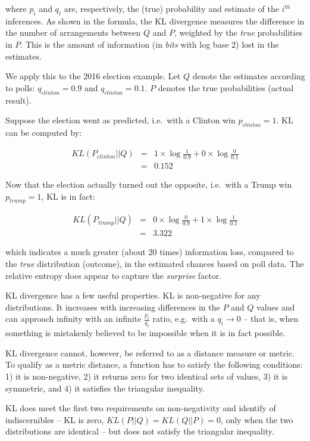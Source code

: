 \documentclass[
  letterpaper,
]{scrbook}
\begin{document}
where \(p_i\) and \(q_i\) are, respectively, the (true) probability and
estimate of the \(i^{th}\) inferences. As shown in the formula, the KL
divergence measures the difference in the number of arrangements between
\(Q\) and \(P\), weighted by the \emph{true} probabilities in \(P\).
This is the amount of information (in \emph{bits} with log base \(2\))
lost in the estimates.

We apply this to the 2016 election example. Let \(Q\) denote the
estimates according to polls: \(q_{clinton}=0.9\) and
\(q_{clinton}=0.1\). \(P\) denotes the true probabilities (actual
result).

Suppose the election went as predicted, i.e.~with a Clinton win
\(p_{clinton}=1\). KL can be computed by:

\[\begin{aligned}
  KL(P_{clinton}||Q)
  & = & 1 \times \log \frac{1}{0.9} + 0 \times \log \frac{0}{0.1} \\
  & = & 0.152
\end{aligned}\]

Now that the election actually turned out the opposite, i.e.~with a
Trump win \(p_{trump}=1\), KL is in fact:

\[\begin{aligned}
  KL(P_{trump}||Q)
  & = & 0 \times \log \frac{0}{0.9} + 1 \times \log \frac{1}{0.1} \\
  & = & 3.322
\end{aligned}\]

which indicates a much greater (about \(20\) times) information loss,
compared to the \emph{true} distribution (outcome), in the estimated
chances based on poll data. The relative entropy does appear to capture
the \emph{surprise} factor.

KL divergence has a few useful properties. KL is non-negative for any
distributions. It increases with increasing differences in the \(P\) and
\(Q\) values and can approach infinity with an infinite
\(\frac{p_i}{q_i}\) ratio, e.g.~with a \(q_i \to 0\) -- that is, when
something is mistakenly believed to be impossible when it is in fact
possible.

KL divergence cannot, however, be referred to as a distance measure or
metric. To qualify as a metric distance, a function has to satisfy the
following conditions: 1) it is non-negative, 2) it returns zero for two
identical sets of values, 3) it is symmetric, and 4) it satisfies the
triangular inequality.

KL does meet the first two requirements on non-negativity and identify
of indiscernibles -- KL is zero, \(KL(P||Q)=KL(Q||P)=0\), only when the
two distributions are identical -- but does not satisfy the triangular
inequality.
\end{document}
